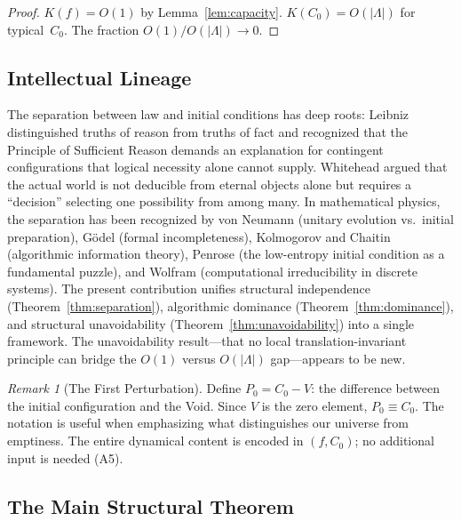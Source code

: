 \documentclass[12pt]{article}
\theoremstyle{plain}
\theoremstyle{definition}
\theoremstyle{remark}
\newtheorem{remark}[theorem]{Remark}
\newcommand{\Lattice}{\Lambda}
\begin{document}
\begin{proof}
$K(f) = O(1)$ by Lemma~\ref{lem:capacity}. $K(C_0) = O(|\Lattice|)$ for typical~$C_0$. The fraction $O(1)/O(|\Lattice|) \!\to\! 0$.
\end{proof}

\subsection{Intellectual Lineage}

The separation between law and initial conditions has deep roots: Leibniz \cite{leibniz1714} distinguished truths of reason from truths of fact and recognized that the Principle of Sufficient Reason demands an explanation for contingent configurations that logical necessity alone cannot supply. Whitehead \cite{whitehead1929} argued that the actual world is not deducible from eternal objects alone but requires a ``decision'' selecting one possibility from among many. In mathematical physics, the separation has been recognized by von Neumann \cite{vonneumann1932} (unitary evolution vs.\ initial preparation), G\"odel \cite{godel1931} (formal incompleteness), Kolmogorov \cite{kolmogorov1965} and Chaitin \cite{chaitin1966} (algorithmic information theory), Penrose \cite{penrose1989} (the low-entropy initial condition as a fundamental puzzle), and Wolfram \cite{wolfram2002} (computational irreducibility in discrete systems). The present contribution unifies structural independence (Theorem~\ref{thm:separation}), algorithmic dominance (Theorem~\ref{thm:dominance}), and structural unavoidability (Theorem~\ref{thm:unavoidability}) into a single framework. The unavoidability result---that no local translation-invariant principle can bridge the $O(1)$ versus $O(|\Lattice|)$ gap---appears to be new.

\begin{remark}[The First Perturbation]\label{rem:perturbation}
Define $P_0 = C_0 - V$: the difference between the initial configuration and the Void. Since $V$ is the zero element, $P_0 \equiv C_0$. The notation is useful when emphasizing what distinguishes our universe from emptiness. The entire dynamical content is encoded in $(f, C_0)$; no additional input is needed (A5).
\end{remark}

\subsection{The Main Structural Theorem}
\end{document}
